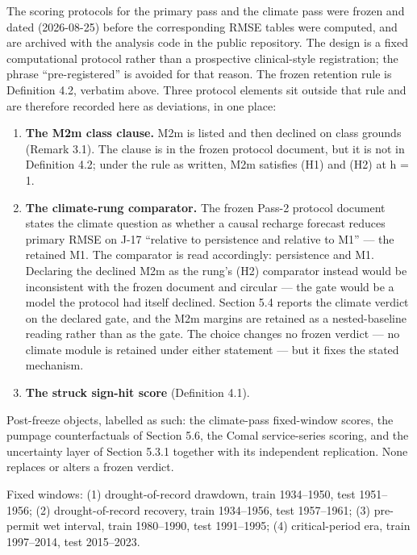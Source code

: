 \documentclass[11pt]{article}
\providecommand{\tightlist}{\setlength{\itemsep}{0pt}\setlength{\parskip}{0pt}}
\begin{document}
The scoring protocols for the primary pass and the climate pass were
frozen and dated (2026-08-25) before the corresponding RMSE tables were
computed, and are archived with the analysis code in the public
repository. The design is a fixed computational protocol rather than a
prospective clinical-style registration; the phrase ``pre-registered''
is avoided for that reason. The frozen retention rule is Definition 4.2,
verbatim above. Three protocol elements sit outside that rule and are
therefore recorded here as deviations, in one place:

\begin{enumerate}
\def\labelenumi{\arabic{enumi}.}
\tightlist
\item
  \textbf{The M2m class clause.} M2m is listed and then declined on
  class grounds (Remark 3.1). The clause is in the frozen protocol
  document, but it is not in Definition 4.2; under the rule as written,
  M2m satisfies (H1) and (H2) at h = 1.
\item
  \textbf{The climate-rung comparator.} The frozen Pass-2 protocol
  document states the climate question as whether a causal recharge
  forecast reduces primary RMSE on J-17 ``relative to persistence and
  relative to M1'' --- the retained M1. The comparator is read
  accordingly: persistence and M1. Declaring the declined M2m as the
  rung's (H2) comparator instead would be inconsistent with the frozen
  document and circular --- the gate would be a model the protocol had
  itself declined. Section 5.4 reports the climate verdict on the
  declared gate, and the M2m margins are retained as a nested-baseline
  reading rather than as the gate. The choice changes no frozen verdict
  --- no climate module is retained under either statement --- but it
  fixes the stated mechanism.
\item
  \textbf{The struck sign-hit score} (Definition 4.1).
\end{enumerate}

Post-freeze objects, labelled as such: the climate-pass fixed-window
scores, the pumpage counterfactuals of Section 5.6, the Comal
service-series scoring, and the uncertainty layer of Section 5.3.1
together with its independent replication. None replaces or alters a
frozen verdict.

Fixed windows: (1) drought-of-record drawdown, train 1934--1950, test
1951--1956; (2) drought-of-record recovery, train 1934--1956, test
1957--1961; (3) pre-permit wet interval, train 1980--1990, test
1991--1995; (4) critical-period era, train 1997--2014, test 2015--2023.
\end{document}
